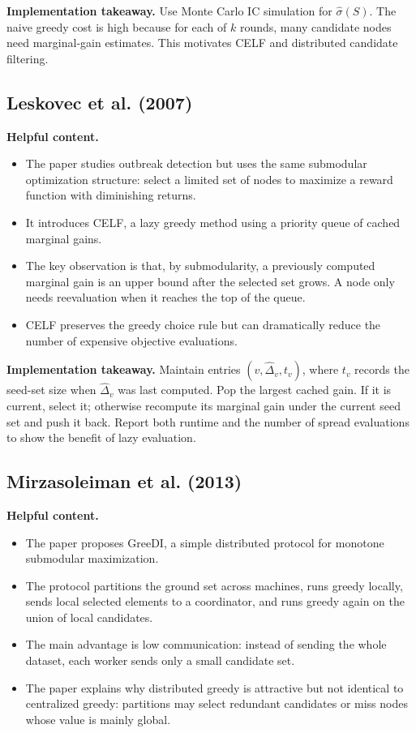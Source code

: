 \documentclass[10pt]{article}
\begin{document}
\textbf{Implementation takeaway.} Use Monte Carlo IC simulation for
$\widehat{\sigma}(S)$. The naive greedy cost is high because for each of $k$
rounds, many candidate nodes need marginal-gain estimates. This motivates CELF
and distributed candidate filtering.

\subsection{Leskovec et al. (2007)}

\textbf{Helpful content.}
\begin{itemize}
\item The paper studies outbreak detection but uses the same submodular
optimization structure: select a limited set of nodes to maximize a reward
function with diminishing returns.
\item It introduces CELF, a lazy greedy method using a priority queue of cached
marginal gains.
\item The key observation is that, by submodularity, a previously computed
marginal gain is an upper bound after the selected set grows. A node only needs
reevaluation when it reaches the top of the queue.
\item CELF preserves the greedy choice rule but can dramatically reduce the
number of expensive objective evaluations.
\end{itemize}

\textbf{Implementation takeaway.} Maintain entries $(v,\widehat{\Delta}_v,t_v)$,
where $t_v$ records the seed-set size when $\widehat{\Delta}_v$ was last
computed. Pop the largest cached gain. If it is current, select it; otherwise
recompute its marginal gain under the current seed set and push it back.
Report both runtime and the number of spread evaluations to show the benefit of
lazy evaluation.

\subsection{Mirzasoleiman et al. (2013)}

\textbf{Helpful content.}
\begin{itemize}
\item The paper proposes GreeDI, a simple distributed protocol for monotone
submodular maximization.
\item The protocol partitions the ground set across machines, runs greedy
locally, sends local selected elements to a coordinator, and runs greedy again
on the union of local candidates.
\item The main advantage is low communication: instead of sending the whole
dataset, each worker sends only a small candidate set.
\item The paper explains why distributed greedy is attractive but not identical
to centralized greedy: partitions may select redundant candidates or miss nodes
whose value is mainly global.
\end{itemize}
\end{document}
